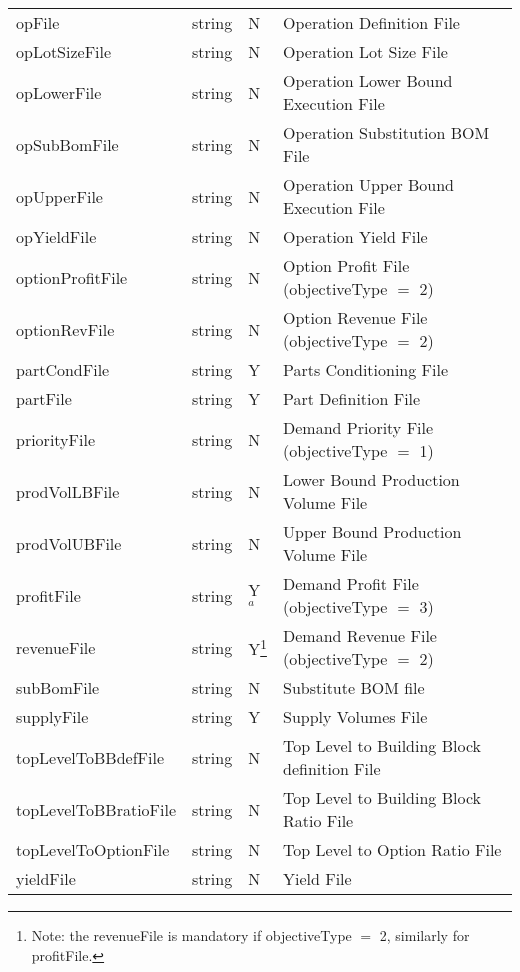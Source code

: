 \begin{minipage}{7.5in}
\begin{tabular}{lllp{3.5in}}
opFile & string & N & Operation Definition File \\
opLotSizeFile & string & N & Operation Lot Size File \\
opLowerFile & string & N & Operation Lower Bound Execution File \\
opSubBomFile & string & N & Operation Substitution BOM File \\
opUpperFile & string & N & Operation Upper Bound Execution File \\
opYieldFile & string & N & Operation Yield File \\
optionProfitFile & string &  N  &  Option Profit File (objectiveType $=$ 2)\\
optionRevFile    & string &  N  &  Option Revenue File (objectiveType $=$ 2)\\
partCondFile     & string &  Y  &  Parts Conditioning File \\
partFile         & string &  Y  &  Part Definition File\\
priorityFile     & string &  N  &  Demand Priority File (objectiveType $=$ 1)\\
prodVolLBFile    & string &  N  &  Lower Bound Production Volume File \\
prodVolUBFile    & string &  N  &  Upper Bound Production Volume File \\
profitFile       & string &  Y$^a$ &  Demand Profit File (objectiveType $=$ 3)\\
revenueFile      & string &  Y\footnote[1]{Note: the revenueFile is mandatory if objectiveType $=$ 2, similarly for profitFile.} & Demand Revenue File (objectiveType $=$ 2)\\
subBomFile       & string &  N  &  Substitute BOM file\\
supplyFile       & string &  Y  &  Supply Volumes File\\
topLevelToBBdefFile & string & N & Top Level to Building Block definition File \\  
topLevelToBBratioFile & string & N & Top Level to Building Block Ratio File \\ 
topLevelToOptionFile & string & N & Top Level to Option Ratio File \\ 
yieldFile        & string &  N  &  Yield File\\
\end{tabular}
\end{minipage}

\vspace{0.5in}


